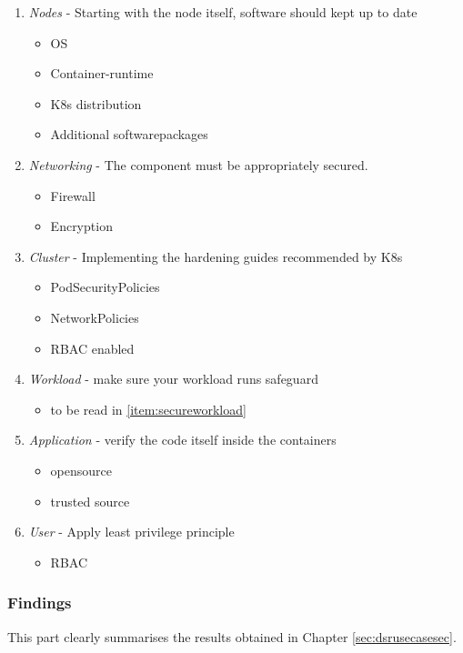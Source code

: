 \documentclass[MSC,Master,english]{twbook}%
\begin{document}
\begin{enumerate}
    \item \textit{Nodes} - Starting with the node itself, software should kept up to date
    \begin{itemize}
        \item \ac{OS}
        \item Container-runtime
        \item \ac{K8s} distribution
        \item Additional softwarepackages
    \end{itemize}
    \item \textit{Networking} - The component must be appropriately secured.
    \begin{itemize}
        \item Firewall
        \item Encryption
    \end{itemize}
    \item \textit{Cluster} - Implementing the hardening guides recommended by \ac{K8s}
    \begin{itemize}
        \item PodSecurityPolicies
        \item NetworkPolicies
        \item \ac{RBAC} enabled
    \end{itemize}
    \item \textit{Workload} - make sure your workload runs safeguard
    \begin{itemize}
        \item to be read in \autoref{item:secureworkload}
    \end{itemize}
    \item \textit{Application} - verify the code itself inside the containers
    \begin{itemize}
        \item opensource
        \item trusted source
    \end{itemize}
    \item \textit{User} - Apply least privilege principle
    \begin{itemize}
        \item \ac{RBAC}
    \end{itemize}
\end{enumerate}

\subsubsection{Findings} This part clearly summarises the results obtained in Chapter \autoref{sec:dsrusecasesec}.
\end{document}

